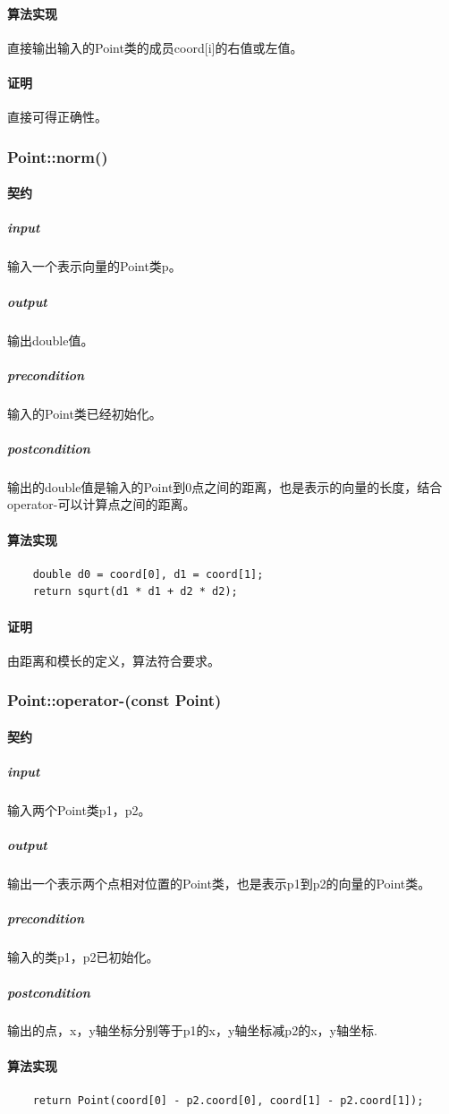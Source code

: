 \documentclass[a4paper]{book}
\numberwithin{equation}{chapter}
\theoremstyle{definition}
\begin{document}
\paragraph{算法实现}
直接输出输入的Point类的成员coord[i]的右值或左值。
\paragraph{证明}
直接可得正确性。

\subsubsection{Point::norm()}
\paragraph{契约}
\subparagraph{input}
输入一个表示向量的Point类p。
\subparagraph{output}
输出double值。
\subparagraph{precondition}
输入的Point类已经初始化。
\subparagraph{postcondition}
输出的double值是输入的Point到0点之间的距离，也是表示的向量的长度，结合operator-可以计算点之间的距离。
\paragraph{算法实现}
\begin{lstlisting}
	double d0 = coord[0], d1 = coord[1];
	return squrt(d1 * d1 + d2 * d2);
\end{lstlisting}
\paragraph{证明}
由距离和模长的定义，算法符合要求。

\subsubsection{Point::operator-(const Point)}
\paragraph{契约}
\subparagraph{input}
输入两个Point类p1，p2。
\subparagraph{output}
输出一个表示两个点相对位置的Point类，也是表示p1到p2的向量的Point类。
\subparagraph{precondition}
输入的类p1，p2已初始化。
\subparagraph{postcondition}
输出的点，x，y轴坐标分别等于p1的x，y轴坐标减p2的x，y轴坐标.
\paragraph{算法实现}
\begin{lstlisting}
	return Point(coord[0] - p2.coord[0], coord[1] - p2.coord[1]);
\end{lstlisting}
\end{document}
